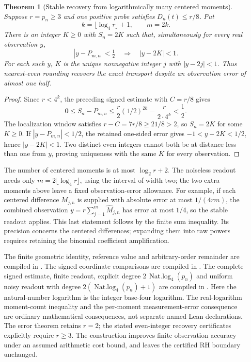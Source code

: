 \documentclass[11pt]{article}
\newtheorem{theorem}{Theorem}[section]
\theoremstyle{definition}
\begin{document}
\begin{theorem}[Stable recovery from logarithmically many centered moments]
Suppose $r=p_n\ge3$ and one positive probe satisfies $D_n(t)\le r/8$.
Put
\[
 k=\lfloor\log_4 r\rfloor+1,\qquad m=2k.
\]
There is an integer $K\ge0$ with $S_n=2K$ such that, simultaneously
for every real observation $y$,
\[
 |y-P_{m,n}|<\tfrac12
 \quad\Longrightarrow\quad |y-2K|<1.
\]
For each such $y$, $K$ is the unique nonnegative integer $j$
with $|y-2j|<1$. Thus nearest-even rounding recovers the exact
transport despite an observation error of almost one half.
\end{theorem}
\begin{proof}
Since $r<4^k$, the preceding signed estimate with $C=r/8$ gives
\[
 0\le S_n-P_{m,n}
 \le \frac r2(1/2)^{2k}
 =\frac{r}{2\cdot4^k}<\frac12.
\]
The localization window satisfies $r-C=7r/8\ge21/8>2$, so
$S_n=2K$ for some $K\ge0$.
If $|y-P_{m,n}|<1/2$, the retained one-sided error gives
$-1<y-2K<1/2$, hence $|y-2K|<1$.
Two distinct even integers cannot both be at distance less than one
from $y$, proving uniqueness with the same $K$ for every observation.
\end{proof}

The number of centered moments is at most $\log_2 r+2$.
The noiseless readout needs only
$m=2\lfloor\log_4 r\rfloor$, using the interval of width two;
the two extra moments above leave a fixed observation-error allowance.
For example, if each centered difference $M_{j,n}$ is supplied with
absolute error at most $1/(4rm)$, the combined observation
$y=r\sum_{j=1}^m\widehat M_{j,n}$ has error at most $1/4$,
so the stable readout applies. This last statement follows by the
finite sum inequality. Its precision concerns the centered differences;
expanding them into raw powers requires retaining the binomial
coefficient amplification.

\begin{flushleft}
The finite geometric identity, reference value and arbitrary-order
remainder are compiled in
.
The signed coordinate comparisons are compiled in
.
The complete signed estimate, finite readout, explicit degree
$2\,\operatorname{Nat.log}_4(p_n)$ and uniform noisy readout with degree
$2(\operatorname{Nat.log}_4(p_n)+1)$ are compiled in
.
Here the natural-number logarithm is the integer base-four logarithm.
The real-logarithm moment-count inequality and the per-moment
measurement-error consequence are ordinary mathematical consequences,
not separate named Lean declarations.
The error theorem retains $r=2$; the stated even-integer recovery
certificates explicitly require $r\ge3$.
The construction improves finite observation accuracy under an
assumed arithmetic cost bound, and leaves the certified RH boundary unchanged.
\end{flushleft}
\end{document}
